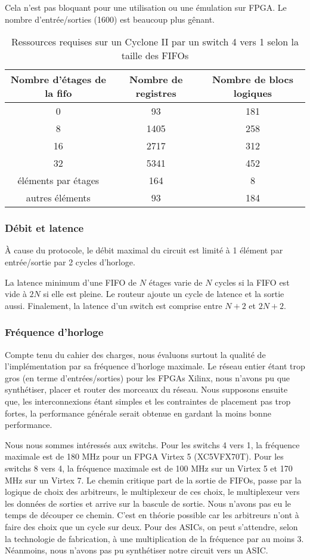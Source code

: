 \documentclass[11pt]{article}
\begin{document}
Cela n'est pas bloquant pour une utilisation ou une émulation sur FPGA. Le nombre d'entrée/sorties (1600) est beaucoup plus gênant.

\begin{table}
\centering
\begin{tabular}{|c|c|c|}
\hline
Nombre d'étages de la fifo & Nombre de registres & Nombre de blocs logiques \\
\hline
0 & 93 & 181 \\
8 & 1405 & 258 \\
16 &  2717 & 312 \\
32 & 5341 & 452 \\
\hline \hline
éléments par étages & 164 & 8 \\
autres éléments & 93 & 184 \\
\hline
\end{tabular}
\caption{Ressources requises sur un Cyclone II par un switch 4 vers 1 selon la taille des FIFOs}
\label{perfs-sw-4}
\end{table}

\subsubsection{Débit et latence}
\`A cause du protocole, le débit maximal du circuit est limité à 1 élément par entrée/sortie par 2 cycles d'horloge.

La latence minimum d'une FIFO de $N$ étages varie de $N$ cycles si la FIFO est vide à $2N$ si elle est pleine. Le routeur ajoute un cycle de latence et la sortie aussi. Finalement, la latence d'un switch est comprise entre $N+2$ et $2N+2$.

\subsubsection{Fréquence d'horloge}
Compte tenu du cahier des charges, nous évaluons surtout la qualité de l'implémentation par sa fréquence d'horloge maximale. Le réseau entier étant trop gros (en terme d'entrées/sorties) pour les FPGAs Xilinx, nous n'avons pu que synthétiser, placer et router des morceaux du réseau. Nous supposons ensuite que, les interconnexions étant simples et les contraintes de placement pas trop fortes, la performance générale serait obtenue en gardant la moins bonne performance.

Nous nous sommes intéressés aux switchs. Pour les switchs 4 vers 1, la fréquence maximale est de 180 MHz pour un FPGA Virtex 5 (XC5VFX70T). Pour les switchs 8 vers 4, la fréquence maximale est de 100 MHz sur un Virtex 5 et 170 MHz sur un Virtex 7. Le chemin critique part de la sortie de FIFOs, passe par la logique de choix des arbitreurs, le multiplexeur de ces choix, le multiplexeur vers les données de sorties et arrive sur la bascule de sortie. Nous n'avons pas eu le temps de découper ce chemin. C'est en théorie possible car les arbitreurs n'ont à faire des choix que un cycle sur deux. Pour des ASICs, on peut s'attendre, selon la technologie de fabrication, à une multiplication de la fréquence par au moins 3. Néanmoins, nous n'avons pas pu synthétiser notre circuit vers un ASIC.
\end{document}
